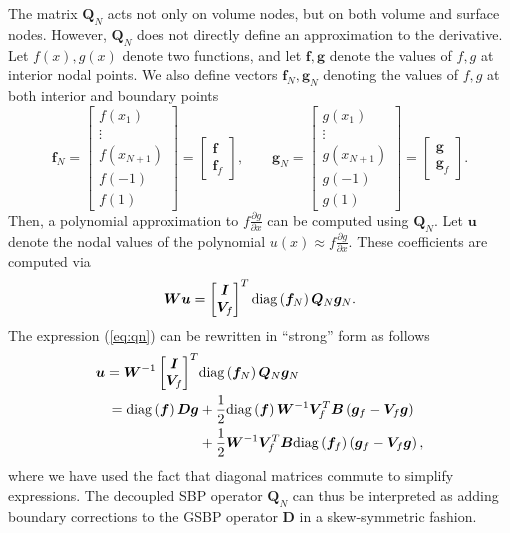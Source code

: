 \documentclass[review,onefignum,onetabnum,final]{siamart171218}
\newcommand{\pd}[2]{\frac{\partial#1}{\partial#2}}
\newcommand{\LRp}[1]{\left( #1 \right)}
\newcommand{\diag}[1]{{\rm diag}\LRp{#1}}
\begin{document}
The matrix $\bm{Q}_N$ acts not only on volume nodes, but on both volume and surface nodes.  However, $\bm{Q}_N$ does not directly define an approximation to the derivative.  Let $f(x), g(x)$ denote two functions, and let $\bm{f}, \bm{g}$ denote the values of $f,g$ at interior nodal points.  We also define vectors $\bm{f}_N, \bm{g}_N$ denoting the values of $f,g$ at both interior and boundary points 
\begin{equation}
\bm{f}_N = \begin{bmatrix}
f\LRp{x_1}\\
\vdots\\
f\LRp{x_{N+1}}\\
f(-1)\\
f(1)
\end{bmatrix} = \begin{bmatrix}
\bm{f} \\
\bm{f}_f
\end{bmatrix}, \qquad
\bm{g}_N = \begin{bmatrix}
g\LRp{x_1}\\
\vdots\\
g\LRp{x_{N+1}}\\
g(-1)\\
g(1)
\end{bmatrix} = \begin{bmatrix}
\bm{g} \\
\bm{g}_f
\end{bmatrix}.
\label{eq:fg}
\end{equation}
Then, a polynomial approximation to $f\pd{g}{x}$ can be computed using $\bm{Q}_N$.  Let $\bm{u}$ denote the nodal values of the polynomial $u(x) \approx f\pd{g}{x}$.  These coefficients are computed via
\begin{equation}
\bm{W}\bm{u} = \begin{bmatrix}
\bm{I}\\
\bm{V}_f
\end{bmatrix}^T \diag{\bm{f}_N} \bm{Q}_N \bm{g}_N.
\label{eq:qn}
\end{equation}
The expression (\ref{eq:qn}) can be rewritten in ``strong'' form as follows
\begin{align*}
\bm{u} = \bm{W}^{-1}\begin{bmatrix}
\bm{I}\\
\bm{V}_f
\end{bmatrix}^T& \diag{\bm{f}_N} \bm{Q}_N \bm{g}_N \\
= \diag{\bm{f}}\bm{D}\bm{g} &+ \frac{1}{2}\diag{\bm{f}} \bm{W}^{-1} \bm{V}_f^T \bm{B}\LRp{\bm{g}_f - \bm{V}_f\bm{g}} \\
&+ \frac{1}{2}\bm{W}^{-1} \bm{V}_f^T\bm{B}\diag{\bm{f}_f} \LRp{\bm{g}_f - \bm{V}_f\bm{g}},
\end{align*}
where we have used the fact that diagonal matrices commute to simplify expressions.  The decoupled SBP operator $\bm{Q}_N$ can thus be interpreted as adding boundary corrections to the GSBP operator $\bm{D}$ in a skew-symmetric fashion.  
\end{document}
